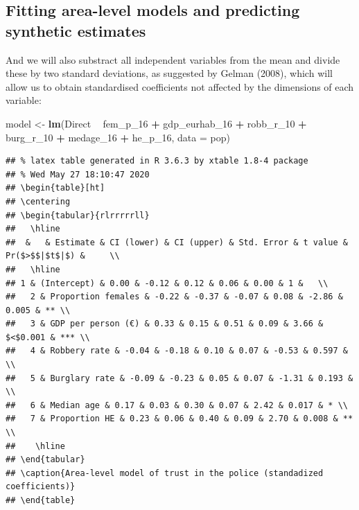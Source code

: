 \documentclass[
]{article}
\newenvironment{Shaded}{\begin{snugshade}}{\end{snugshade}}
\newcommand{\DataTypeTok}[1]{\textcolor[rgb]{0.13,0.29,0.53}{#1}}
\newcommand{\DecValTok}[1]{\textcolor[rgb]{0.00,0.00,0.81}{#1}}
\newcommand{\KeywordTok}[1]{\textcolor[rgb]{0.13,0.29,0.53}{\textbf{#1}}}
\newcommand{\NormalTok}[1]{#1}
\newcommand{\OperatorTok}[1]{\textcolor[rgb]{0.81,0.36,0.00}{\textbf{#1}}}
\newcommand{\StringTok}[1]{\textcolor[rgb]{0.31,0.60,0.02}{#1}}
\begin{document}
\hypertarget{fitting-area-level-models-and-predicting-synthetic-estimates}{%
\subsection{Fitting area-level models and predicting synthetic
estimates}\label{fitting-area-level-models-and-predicting-synthetic-estimates}}

And we will also substract all independent variables from the mean and
divide these by two standard deviations, as suggested by Gelman (2008),
which will allow us to obtain standardised coefficients not affected by
the dimensions of each variable:

\begin{Shaded}
\begin{Highlighting}[]
\NormalTok{model <-}\StringTok{ }\KeywordTok{lm}\NormalTok{(Direct }\OperatorTok{~}\StringTok{  }\NormalTok{fem_p_}\DecValTok{16}  \OperatorTok{+}\StringTok{ }\NormalTok{gdp_eurhab_}\DecValTok{16} \OperatorTok{+}\StringTok{ }\NormalTok{robb_r_}\DecValTok{10} \OperatorTok{+}\StringTok{ }
\StringTok{                      }\NormalTok{burg_r_}\DecValTok{10} \OperatorTok{+}\StringTok{  }\NormalTok{medage_}\DecValTok{16}    \OperatorTok{+}\StringTok{ }\NormalTok{he_p_}\DecValTok{16}\NormalTok{, }
            \DataTypeTok{data =}\NormalTok{ pop)}
\end{Highlighting}
\end{Shaded}

\begin{verbatim}
## % latex table generated in R 3.6.3 by xtable 1.8-4 package
## % Wed May 27 18:10:47 2020
## \begin{table}[ht]
## \centering
## \begin{tabular}{rlrrrrrll}
##   \hline
##  &   & Estimate & CI (lower) & CI (upper) & Std. Error & t value & Pr($>$$|$t$|$) &     \\ 
##   \hline
## 1 & (Intercept) & 0.00 & -0.12 & 0.12 & 0.06 & 0.00 & 1 &   \\ 
##   2 & Proportion females & -0.22 & -0.37 & -0.07 & 0.08 & -2.86 & 0.005 & ** \\ 
##   3 & GDP per person (€) & 0.33 & 0.15 & 0.51 & 0.09 & 3.66 & $<$0.001 & *** \\ 
##   4 & Robbery rate & -0.04 & -0.18 & 0.10 & 0.07 & -0.53 & 0.597 &   \\ 
##   5 & Burglary rate & -0.09 & -0.23 & 0.05 & 0.07 & -1.31 & 0.193 &   \\ 
##   6 & Median age & 0.17 & 0.03 & 0.30 & 0.07 & 2.42 & 0.017 & * \\ 
##   7 & Proportion HE & 0.23 & 0.06 & 0.40 & 0.09 & 2.70 & 0.008 & ** \\ 
##    \hline
## \end{tabular}
## \caption{Area-level model of trust in the police (standadized coefficients)} 
## \end{table}
\end{verbatim}
\end{document}
